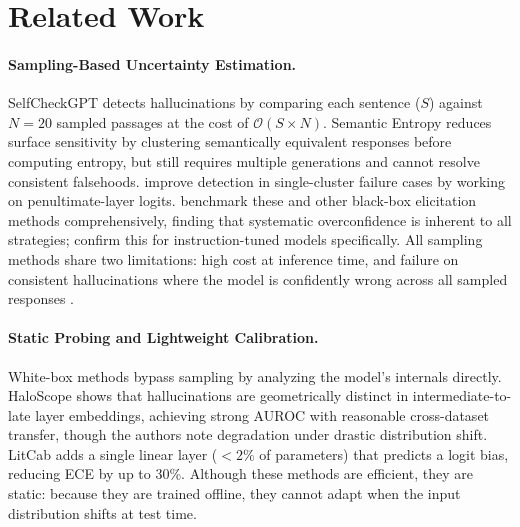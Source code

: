 \documentclass[11pt]{article}
\begin{document}
\section{Related Work} \label{sec:related-work}

\paragraph{Sampling-Based Uncertainty Estimation.}
SelfCheckGPT \cite{manakul_selfcheckgpt_2023} detects hallucinations by comparing each sentence ($S$) against $N{=}20$ sampled passages at the cost of $\mathcal{O}(S \times N)$.
Semantic Entropy \cite{kuhn_semantic_2023} reduces surface sensitivity by clustering semantically equivalent responses before computing entropy, but still requires multiple generations and cannot resolve consistent falsehoods. \citet{ma_semantic_2025} improve detection in single-cluster failure cases by working on penultimate-layer logits. 
\citet{xiong_can_2024} benchmark these and other black-box elicitation methods comprehensively, finding that systematic overconfidence is inherent to all strategies; \citet{heo_llms_2025} confirm this for instruction-tuned models specifically. All sampling methods share two limitations: high cost at inference time, and failure on consistent hallucinations where the model is confidently wrong across all sampled responses \cite{lin_truthfulqa_2021}.

\paragraph{Static Probing and Lightweight Calibration.}
White-box methods bypass sampling by analyzing the model's internals directly. HaloScope \cite{du_haloscope_2024} shows that hallucinations are geometrically distinct in intermediate-to-late layer embeddings, achieving strong AUROC with reasonable cross-dataset transfer, though the authors note degradation under drastic distribution shift. LitCab \cite{liu_litcab_2024} adds a single linear layer (${<}2\%$ of parameters) that predicts a logit bias, reducing ECE by up to 30\%. Although these methods are efficient, they are static: because they are trained offline, they cannot adapt when the input distribution shifts at test time.
\end{document}

